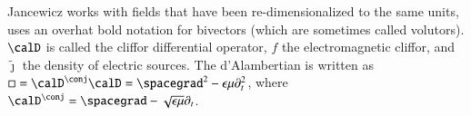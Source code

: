 Jancewicz works with fields that have been re-dimensionalized to the same units, uses an overhat bold notation for bivectors (which are sometimes called volutors).
\( \calD \) is called the cliffor differential operator, \( f \) the electromagnetic cliffor, and \( \tilde{\jmath} \) the density of electric sources.
The d'Alambertian is written
as \( \Box = \calD^\conj \calD = \spacegrad^2 - \epsilon\mu \partial_t^2 \), where
\( \calD^\conj = \spacegrad - \sqrt{\epsilon\mu} \partial_t \).

